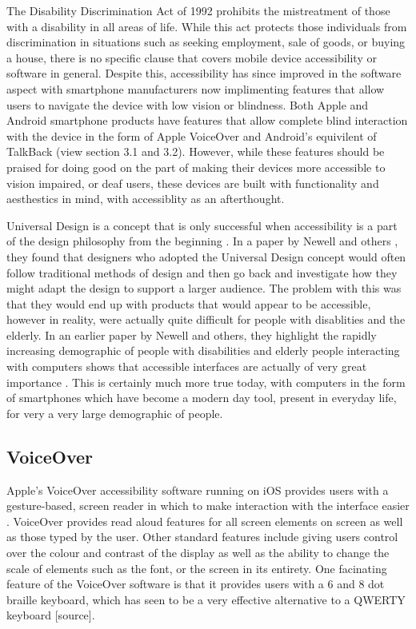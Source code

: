 The Disability Discrimination Act of 1992 \cite{dda1992} prohibits the mistreatment of those with a disability in all areas of life.
While this act protects those individuals from discrimination in situations such as seeking employment, sale of goods, or buying a house, there is no specific clause that covers mobile device accessibility or software in general.
Despite this, accessibility has since improved in the software aspect with smartphone manufacturers now implimenting features that allow users to navigate the device with low vision or blindness.
Both Apple and Android smartphone products have features that allow complete blind interaction with the device in the form of Apple VoiceOver \cite{iphone} and Android's equivilent of TalkBack \cite{android} (view section 3.1 and 3.2).
However, while these features should be praised for doing good on the part of making their devices more accessible to vision impaired, or deaf users, these devices are built with functionality and aesthestics in mind, with accessiblity as an afterthought.

Universal Design is a concept that is only successful when accessibility is a part of the design philosophy from the beginning \cite{incldesign}.
In a paper by Newell and others \cite{incldesign}, they found that designers who adopted the Universal Design concept would often follow traditional methods of design and then go back and investigate how they might adapt the design to support a larger audience.
The problem with this was that they would end up with products that would appear to be accessible, however in reality, were actually quite difficult for people with disablities and the elderly.
In an earlier paper by Newell and others, they highlight the rapidly increasing demographic of people with disabilities and elderly people interacting with computers shows that accessible interfaces are actually of very great importance \cite{computerinterface}.
This is certainly much more true today, with computers in the form of smartphones which have become a modern day tool, present in everyday life, for very a very large demographic of people.


\subsection{VoiceOver}
Apple's VoiceOver accessibility software running on iOS provides users with a gesture-based, screen reader in which to make interaction with the interface easier \cite{iphone}.
VoiceOver provides read aloud features for all screen elements on screen as well as those typed by the user.
Other standard features include giving users control over the colour and contrast of the display as well as the ability to change the scale of elements such as the font, or the screen in its entirety.
One facinating feature of the VoiceOver software is that it provides users with a 6 and 8 dot braille keyboard, which has seen to be a very effective alternative to a QWERTY keyboard [source]. %

